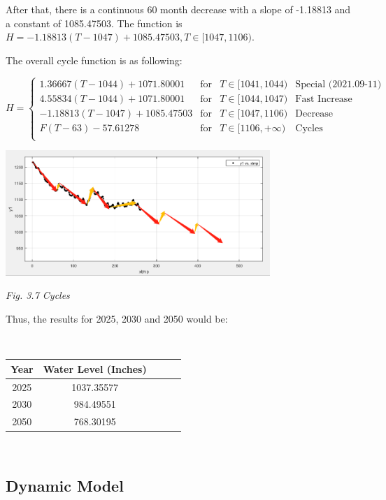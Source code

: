 \documentclass[12pt]{article}
\theoremstyle{definition}
\theoremstyle{remark}
\numberwithin{equation}{section}
\begin{document}
		After that, there is a continuous 60 month decrease with a slope of -1.18813 and a constant of 1085.47503. The function is $H = -1.18813(T-1047)+1085.47503, T \in [1047, 1106)$.

		The overall cycle function is as following:

		$$H =
		\left\{
		\begin{array}{rclr}
		1.36667(T-1044)+1071.80001& \text{for} &T\in[1041,1044) & \text{Special (2021.09-11)}\\
		4.55834(T-1044)+1071.80001& \text{for} &T\in[1044,1047) & \text{Fast Increase}\\
		-1.18813(T-1047)+1085.47503& \text{for} &T\in[1047,1106) & \text{Decrease}\\
		F(T-63)-57.61278& \text{for} &T\in[1106, +\infty) & \text{Cycles}\\
		\end{array}
		\right.$$

		\begin{center}
			\includegraphics[width=10cm]{3.7 Cycles.png}
			
			\small \textit{Fig. 3.7 Cycles}
		\end{center}

		Thus, the results for 2025, 2030 and 2050 would be:

		~\\
		\begin{center}
		\begin{tabular}{ccccc}
			\hline
			Year&Water Level (Inches)\\
			\hline
			2025&1037.35577\\
			2030&984.49551\\
			2050&768.30195\\
			\hline
		\end{tabular}
		\end{center}
		~\\

	\subsection{Dynamic Model}
\end{document}
